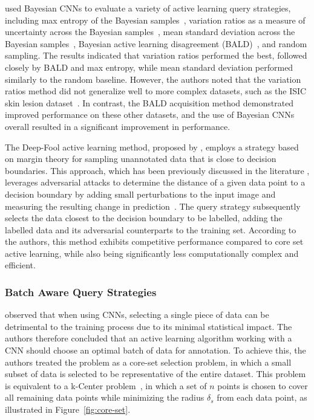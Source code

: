 \cite{gal2017deep} used Bayesian CNNs to evaluate a variety of active learning query strategies, including max entropy of the Bayesian samples~\citep{shin1949mathematical}, variation ratios as a measure of uncertainty across the Bayesian samples~\citep{freeman1965elementary}, mean standard deviation across the Bayesian samples~\citep{kampffmeyer2016semantic}, Bayesian active learning disagreement (BALD)~\citep{houlsby2011bayesian}, and random sampling. The results indicated that variation ratios performed the best, followed closely by BALD and max entropy, while mean standard deviation performed similarly to the random baseline. However, the authors noted that the variation ratios method did not generalize well to more complex datasets, such as the ISIC skin lesion dataset~\citep{gutman2016skin}. In contrast, the BALD acquisition method demonstrated improved performance on these other datasets, and the use of Bayesian CNNs overall resulted in a significant improvement in performance.

The Deep-Fool active learning method, proposed by \cite{ducoffe2018adversarial}, employs a strategy based on margin theory for sampling unannotated data that is close to decision boundaries. This approach, which has been previously discussed in the literature \cite{settles2012active}, leverages adversarial attacks to determine the distance of a given data point to a decision boundary by adding small perturbations to the input image and measuring the resulting change in prediction~\citep{kurakin2016adversarial}. The query strategy subsequently selects the data closest to the decision boundary to be labelled, adding the labelled data and its adversarial counterparts to the training set.  According to the authors, this method exhibits competitive performance compared to core set active learning, while also being significantly less computationally complex and efficient.

\subsubsection{Batch Aware Query Strategies}
\cite{sener2017active} observed that when using CNNs, selecting a single piece of data can be detrimental to the training process due to its minimal statistical impact. The authors therefore concluded that an active learning algorithm working with a CNN should choose an optimal batch of data for annotation. To achieve this, the authors treated the problem as a core-set selection problem, in which a small subset of data is selected to be representative of the entire dataset. This problem is equivalent to a k-Center problem~\citep{farahani2009facility}, in which a set of $n$ points is chosen to cover all remaining data points while minimizing the radius $\delta_s$ from each data point, as illustrated in Figure~\ref{fig:core-set}.

